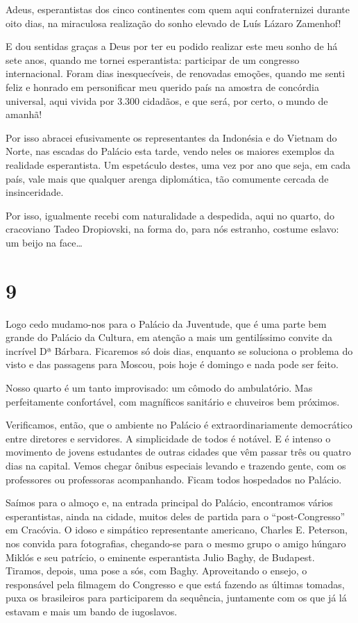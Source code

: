 Adeus, esperantistas dos cinco continentes com quem aqui confraternizei durante oito dias, na miraculosa realização do sonho elevado de Luís Lázaro Zamenhof!

E dou sentidas graças a Deus por ter eu podido realizar este meu sonho de há sete anos, quando me tornei esperantista: participar de um congresso internacional. Foram dias inesquecíveis, de renovadas emoções, quando me senti feliz e honrado em personificar meu querido país na amostra de concórdia universal, aqui vivida por 3.300 cidadãos, e que será, por certo, o mundo de amanhã!

Por isso abracei efusivamente os representantes da Indonésia e do Vietnam do Norte, nas escadas do Palácio esta tarde, vendo neles os maiores exemplos da realidade esperantista. Um espetáculo destes, uma vez por ano que seja, em cada país, vale mais que qualquer arenga diplomática, tão comumente cercada de insinceridade.

Por isso, igualmente recebi com naturalidade a despedida, aqui no quarto, do cracoviano Tadeo Dropiovski, na forma do, para nós estranho, costume eslavo: um beijo na face\ldots

\section*{9 \adfflatleafright {}}
Logo cedo mudamo-nos para o Palácio da Juventude, que é uma parte bem grande do Palácio da Cultura, em atenção a mais um gentilíssimo convite da incrível Dª Bárbara. Ficaremos só dois dias, enquanto se soluciona o problema do visto e das passagens para Moscou, pois hoje é domingo e nada pode ser feito.

Nosso quarto é um tanto improvisado: um cômodo do ambulatório. Mas perfeitamente confortável, com magníficos sanitário e chuveiros bem próximos.

Verificamos, então, que o ambiente no Palácio é extraordinariamente democrático entre diretores e servidores. A simplicidade de todos é notável. E é intenso o movimento de jovens estudantes de outras cidades que vêm passar três ou quatro dias na capital. Vemos chegar ônibus especiais levando e trazendo gente, com os professores ou professoras acompanhando. Ficam todos hospedados no Palácio.

Saímos para o almoço e, na entrada principal do Palácio, encontramos vários esperantistas, ainda na cidade, muitos deles de partida para o “post-Congresso” em Cracóvia. O idoso e simpático representante americano, Charles E. Peterson, nos convida para fotografias, chegando-se para o mesmo grupo o amigo húngaro Miklós e seu patrício, o eminente esperantista Julio Baghy, de Budapest. Tiramos, depois, uma pose a sós, com Baghy. Aproveitando o ensejo, o responsável pela filmagem do Congresso e que está fazendo as últimas tomadas, puxa os brasileiros para participarem da sequência, juntamente com os que já lá estavam e mais um bando de iugoslavos.

